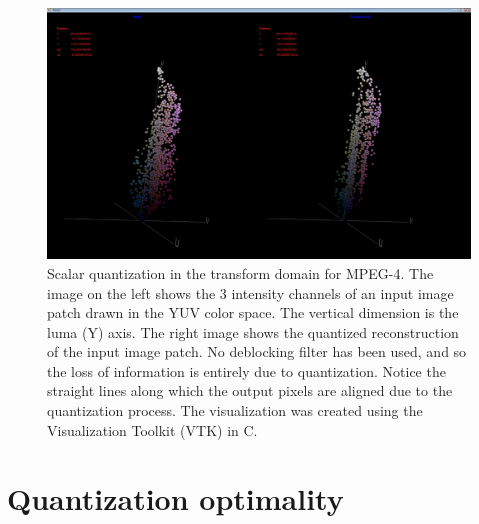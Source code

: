 \begin{Body}
								\begin{figure}[t]		
								\center	
								\includegraphics[height=0.4\textheight]{thesis/MPEG4_VTK.png}
								\caption{Scalar quantization in the transform domain for MPEG-4.  The image on the left shows the 3 intensity channels of an input image patch drawn in the YUV color space.  The vertical dimension is the luma (Y) axis.  The right image shows the quantized reconstruction of the input image patch.  No deblocking filter has been used, and so the loss of information is entirely due to quantization.  Notice the straight lines along which the output pixels are aligned due to the quantization process.  The visualization was created using the Visualization Toolkit (VTK) \cite{VTK} in C.}
								\label{fig:MPEG4_VTK}
								\end{figure}

\section{Quantization optimality}
\label{sec:quantization_optimality}



\end{Body}
